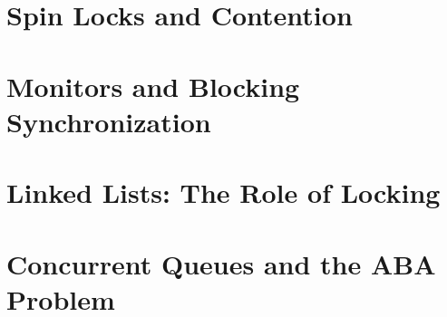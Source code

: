 \documentclass[letter,12pt]{report}
\begin{document}
\chapter{Spin Locks and Contention}












\chapter{Monitors and Blocking Synchronization}




\chapter{Linked Lists: The Role of Locking}






\chapter{Concurrent Queues and the ABA Problem}









\end{document}
